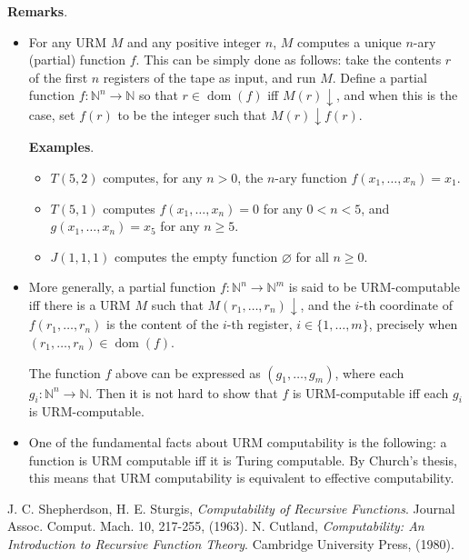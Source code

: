 \documentclass[12pt]{article}
\begin{document}
\textbf{Remarks}.  
\begin{itemize}
\item For any URM $M$ and any positive integer $n$, $M$ computes a unique $n$-ary (partial) function $f$.  This can be simply done as follows: take the contents $r$ of the first $n$ registers of the tape as input, and run $M$.  Define a partial function $f: \mathbb{N}^n \to \mathbb{N}$ so that $r\in \operatorname{dom}(f)$ iff $M(r)\downarrow$, and when this is the case, set $f(r)$ to be the integer such that $M(r)\downarrow \! f(r)$.  

\textbf{Examples}.
\begin{itemize}
\item $T(5,2)$ computes, for any $n>0$, the $n$-ary function $f(x_1,\ldots, x_n)=x_1$.
\item $T(5,1)$ computes $f(x_1,\ldots,x_n)=0$ for any $0<n<5$, and $g(x_1,\ldots,x_n)=x_5$ for any $n\ge 5$.
\item $J(1,1,1)$ computes the empty function $\varnothing$ for all $n\ge 0$.
\end{itemize}

\item More generally, a partial function $f:\mathbb{N}^n \to \mathbb{N}^m$ is said to be URM-computable iff there is a URM $M$ such that $M(r_1,\ldots,r_n)\!\downarrow$, and the $i$-th coordinate of $f(r_1,\ldots, r_n)$ is the content of the $i$-th register, $i\in \lbrace 1,\ldots, m\rbrace$, precisely when $(r_1,\ldots,r_n)\in \operatorname{dom}(f)$.

The function $f$ above can be expressed as $(g_1,\ldots, g_m)$, where each $g_i: \mathbb{N}^n \to \mathbb{N}$.  Then it is not hard to show that $f$ is URM-computable iff each $g_i$ is URM-computable.
\item
One of the fundamental facts about URM computability is the following: a function is URM computable iff it is Turing computable.  By Church's thesis, this means that URM computability is equivalent to effective computability.
\end{itemize}

\begin{thebibliography}{9}
 J. C. Shepherdson, H. E. Sturgis, {\em Computability of Recursive Functions}. Journal Assoc. Comput. Mach. 10, 217-255, (1963).
 N. Cutland, {\em Computability: An Introduction to Recursive Function Theory}. Cambridge University Press, (1980).
\end{thebibliography}
\end{document}

